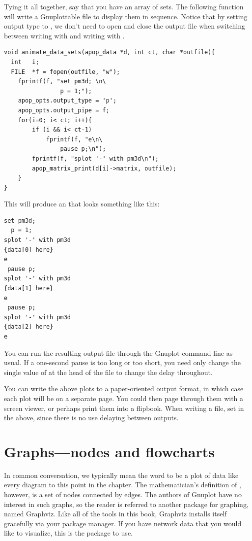 Tying it all together, say that you have an array of  
sets. The following function will write a Gnuplottable file to display
them in sequence. Notice that by setting output type to , we don't
need to open and close the output file when switching between
writing with  and writing with
.
\begin{lstlisting}
void animate_data_sets(apop_data *d, int ct, char *outfile){
  int   i;
  FILE  *f = fopen(outfile, "w");
    fprintf(f, "set pm3d; \n\
                p = 1;");
    apop_opts.output_type = 'p';
    apop_opts.output_pipe = f;
    for(i=0; i< ct; i++){
        if (i && i< ct-1)
            fprintf(f, "e\n\
                pause p;\n");
        fprintf(f, "splot '-' with pm3d\n");
        apop_matrix_print(d[i]->matrix, outfile);
    }
}
\end{lstlisting}
This will produce an  that looks something like this:
\begin{lstlisting}
set pm3d;
  p = 1;
splot '-' with pm3d
{data[0] here}
e
 pause p;
splot '-' with pm3d
{data[1] here}
e
 pause p;
splot '-' with pm3d
{data[2] here}
e
\end{lstlisting}

You can run the resulting output file through the Gnuplot command line
as usual. If a one-second pause is too long or too short, you need only
change the single value of \ci{p} at the head of the file to change the
delay throughout.

You can write the above plots to a paper-oriented output format, in which
case each plot will be on a separate page. You could then page through
them with a screen viewer, or perhaps print them into a flipbook. When writing a
file, set \ci{p=0} in the above, since there is no use delaying between
outputs.


\section{\treesymbol Graphs---nodes and flowcharts} In common conversation, we
typically mean the word  to be a plot of data like every
diagram to this point in the chapter. The mathematician's definition
of \airq{graph}, however, is a set of nodes connected by edges. The
authors of Gnuplot have no interest in such graphs, so the reader is
referred to another package for graphing, named Graphviz. Like
all of the tools in this book, Graphviz installs itself
gracefully via your package manager. If you have network data that you
would like to visualize, this is the package to use.

